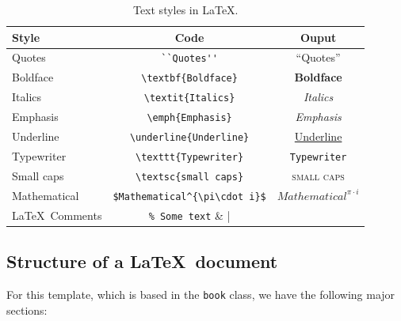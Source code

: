 \begin{table}[h]
	\centering
	\begin{tabular}{lcc}
	  \toprule
	  Style & Code & Ouput \\
	  \midrule
	  Quotes & \verb|``Quotes''| & ``Quotes'' \\
	  Boldface & \verb|\textbf{Boldface}| & \textbf{Boldface} \\
	  Italics & \verb|\textit{Italics}| & \textit{Italics} \\
	  Emphasis & \verb|\emph{Emphasis}| & \emph{Emphasis} \\
	  Underline & \verb|\underline{Underline}| & \underline{Underline} \\
	  Typewriter & \verb|\texttt{Typewriter}| & \texttt{Typewriter} \\
	  Small caps & \verb|\textsc{small caps}| & \textsc{small caps} \\
	  Mathematical & \verb|$Mathematical^{\pi\cdot i}$| & $Mathematical^{\pi\cdot i}$ \\
	  \LaTeX\ Comments & \verb|% Some text| & %
	  \\
	  \bottomrule
	\end{tabular}
	\caption{Text styles in \LaTeX.}
	\label{fig:textstyles}
\end{table}

\subsection{Structure of a \LaTeX\ document}

For this template, which is based in the \texttt{book} class, we have the following major sections:

